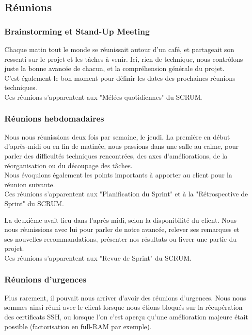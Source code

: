 \subsection{Réunions}

\subsubsection{Brainstorming et Stand-Up Meeting}

Chaque matin tout le monde se réunissait autour d'un café, et partageait son ressenti sur le projet et les tâches à venir. Ici, rien de technique, nous contrôlons juste la bonne avancée de chacun, et la compréhension générale du projet. \\
C'est également le bon moment pour définir les dates des prochaines réunions techniques.\\
Ces réunions s'apparentent aux "Mélées quotidiennes" du SCRUM.

\subsubsection{Réunions hebdomadaires}

Nous nous réunissions deux fois par semaine, le jeudi.
La première en début d'après-midi ou en fin de matinée, nous passions dans une salle au calme, pour parler des difficultés techniques rencontrées, des axes d'améliorations, de la réorganisation ou du découpage des tâches.\\
Nous évoquions également les points importants à apporter au client pour la réunion suivante.\\
Ces réunions s'apparentent aux "Planification du Sprint" et à la "Rétrospective de Sprint" du SCRUM.

La deuxième avait lieu dans l'après-midi, selon la disponibilité du client. Nous nous réunissions avec lui pour parler de notre avancée, relever ses remarques et ses nouvelles recommandations, présenter nos résultats ou livrer une partie du projet.\\
Ces réunions s'apparentent aux "Revue de Sprint" du SCRUM.

\subsubsection{Réunions d'urgences}

Plus rarement, il pouvait nous arriver d'avoir des réunions d'urgences. Nous nous sommes ainsi réuni avec le client lorsque nous étions bloqués sur la récupération des certificats SSH, ou lorsque l'on c'est aperçu qu'une amélioration majeure était possible (factorisation en full-RAM par exemple).


